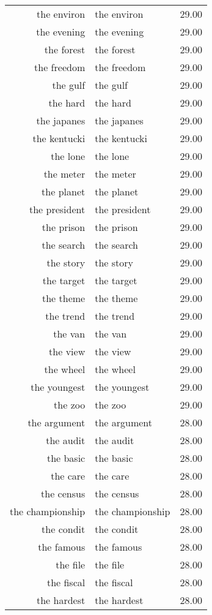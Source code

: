 \begin{table}[ht]
\begin{tabular}{rlr}
  the environ & the environ & 29.00 \\ 
  the evening & the evening & 29.00 \\ 
  the forest & the forest & 29.00 \\ 
  the freedom & the freedom & 29.00 \\ 
  the gulf & the gulf & 29.00 \\ 
  the hard & the hard & 29.00 \\ 
  the japanes & the japanes & 29.00 \\ 
  the kentucki & the kentucki & 29.00 \\ 
  the lone & the lone & 29.00 \\ 
  the meter & the meter & 29.00 \\ 
  the planet & the planet & 29.00 \\ 
  the president & the president & 29.00 \\ 
  the prison & the prison & 29.00 \\ 
  the search & the search & 29.00 \\ 
  the story & the story & 29.00 \\ 
  the target & the target & 29.00 \\ 
  the theme & the theme & 29.00 \\ 
  the trend & the trend & 29.00 \\ 
  the van & the van & 29.00 \\ 
  the view & the view & 29.00 \\ 
  the wheel & the wheel & 29.00 \\ 
  the youngest & the youngest & 29.00 \\ 
  the zoo & the zoo & 29.00 \\ 
  the argument & the argument & 28.00 \\ 
  the audit & the audit & 28.00 \\ 
  the basic & the basic & 28.00 \\ 
  the care & the care & 28.00 \\ 
  the census & the census & 28.00 \\ 
  the championship & the championship & 28.00 \\ 
  the condit & the condit & 28.00 \\ 
  the famous & the famous & 28.00 \\ 
  the file & the file & 28.00 \\ 
  the fiscal & the fiscal & 28.00 \\ 
  the hardest & the hardest & 28.00 \\ 

\end{tabular}
\end{table}
